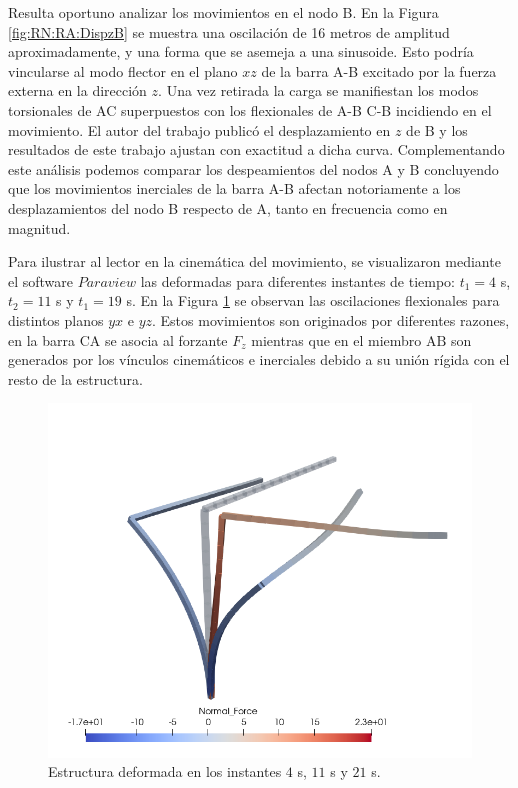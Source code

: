 Resulta oportuno analizar los movimientos en el nodo B. En la Figura \ref{fig:RN:RA:DispzB} se muestra una oscilación de 16 metros de amplitud aproximadamente, y una forma que se asemeja a una sinusoide. Esto podría vincularse al modo flector en el plano $xz$ de la barra A-B excitado por la fuerza externa en la dirección $z$. Una vez retirada la carga se manifiestan los modos torsionales de AC superpuestos con los flexionales de A-B C-B incidiendo en el movimiento. El autor del trabajo \textcite{Le2014} publicó el desplazamiento en $z$ de B y los resultados de este trabajo ajustan con exactitud a dicha curva. Complementando este análisis podemos comparar los despeamientos del nodos A y B concluyendo que los movimientos inerciales de la barra A-B afectan notoriamente a los desplazamientos del nodo B respecto de A, tanto en frecuencia como en magnitud. 



Para ilustrar al lector en la cinemática del movimiento, se visualizaron mediante el software $\textit{Paraview}$ las deformadas para diferentes instantes de tiempo: $t_1=4$ s, $t_2=11$ s y $t_1=19$ s. En la Figura \ref{fig:RN:RA:Deformadas} se observan las oscilaciones flexionales para distintos planos $yx$ e $yz$. Estos movimientos son originados por diferentes razones, en la barra $\text{CA}$ se asocia al forzante $F_z$ mientras que en el miembro $\text{AB}$ son generados por los vínculos cinemáticos e inerciales debido a su unión rígida con el resto de la estructura.

\begin{figure}[htbp]
	\centering
	\includegraphics[width=120mm]{./imagenes/ResultadosNumericos/RightAngeCantilever/Deformadas.png}
	\caption{Estructura deformada en los instantes $4$ s, $11$ s y $21$ s.}
	\label{fig:RN:RA:Deformadas}
\end{figure}


